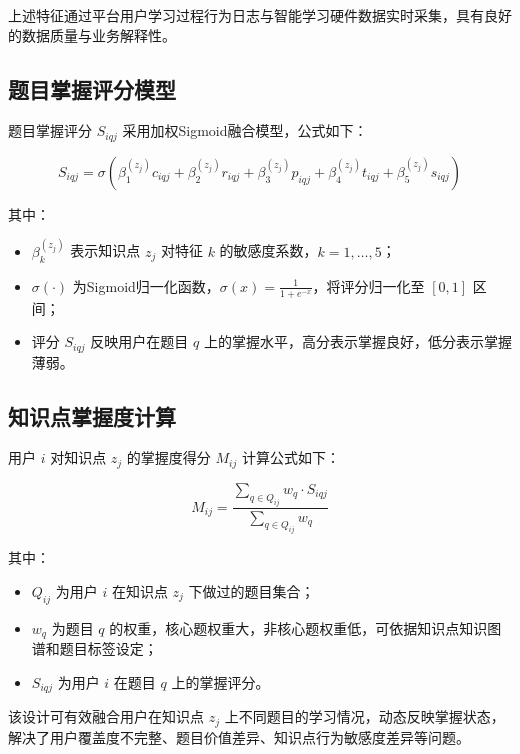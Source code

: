 上述特征通过平台用户学习过程行为日志与智能学习硬件数据实时采集，具有良好的数据质量与业务解释性。

\subsection{题目掌握评分模型}

题目掌握评分 $S_{iqj}$ 采用加权Sigmoid融合模型，公式如下：

\begin{equation}
S_{iqj} = \sigma \left( \beta_1^{(z_j)} c_{iqj} + \beta_2^{(z_j)} r_{iqj} + \beta_3^{(z_j)} p_{iqj} + \beta_4^{(z_j)} t_{iqj} + \beta_5^{(z_j)} s_{iqj} \right)
\end{equation}

其中：

\begin{itemize}
\item $\beta_k^{(z_j)}$ 表示知识点 $z_j$ 对特征 $k$ 的敏感度系数，$k = 1, \ldots, 5$；
\item $\sigma(\cdot)$ 为Sigmoid归一化函数，$\sigma(x) = \frac{1}{1 + e^{-x}}$，将评分归一化至 $[0,1]$ 区间；
\item 评分 $S_{iqj}$ 反映用户在题目 $q$ 上的掌握水平，高分表示掌握良好，低分表示掌握薄弱。
\end{itemize}

\subsection{知识点掌握度计算}

用户 $i$ 对知识点 $z_j$ 的掌握度得分 $M_{ij}$ 计算公式如下：

\begin{equation}
M_{ij} = \frac{ \sum\limits_{q \in Q_{ij}} w_q \cdot S_{iqj} }{ \sum\limits_{q \in Q_{ij}} w_q }
\end{equation}

其中：

\begin{itemize}
\item $Q_{ij}$ 为用户 $i$ 在知识点 $z_j$ 下做过的题目集合；
\item $w_q$ 为题目 $q$ 的权重，核心题权重大，非核心题权重低，可依据知识点知识图谱和题目标签设定；
\item $S_{iqj}$ 为用户 $i$ 在题目 $q$ 上的掌握评分。
\end{itemize}

该设计可有效融合用户在知识点 $z_j$ 上不同题目的学习情况，动态反映掌握状态，解决了用户覆盖度不完整、题目价值差异、知识点行为敏感度差异等问题。


